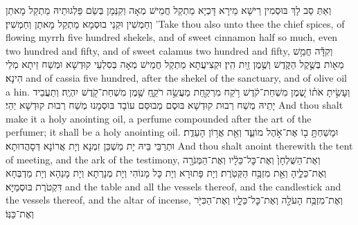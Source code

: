 {וְאַתְּ סַב לָךְ בּוּסְמִין רֵישָׁא מֵירָא דָּכְיָא מַתְקַל חֲמֵישׁ מְאָה וְקִנְּמָן בְּשַׂם פַּלְגוּתֵיהּ מַתְקַל מָאתַן וְחַמְשִׁין וּקְנֵי בוּסְמָא מַתְקַל מָאתַן וְחַמְשִׁין׃}
{’Take thou also unto thee the chief spices, of flowing myrrh five hundred shekels, and of sweet cinnamon half so much, even two hundred and fifty, and of sweet calamus two hundred and fifty,}{}
{וְקִדָּ֕ה חֲמֵ֥שׁ מֵא֖וֹת בְּשֶׁ֣קֶל הַקֹּ֑דֶשׁ וְשֶׁ֥מֶן זַ֖יִת הִֽין׃
}
{וּקְצִיעֲתָא מַתְקַל חֲמֵישׁ מְאָה בְּסִלְעֵי קוּדְשָׁא וּמְשַׁח זֵיתָא מְלֵי הִינָא׃}
{and of cassia five hundred, after the shekel of the sanctuary, and of olive oil a hin.}{}
{וְעָשִׂ֣יתָ אֹת֗וֹ שֶׁ֚מֶן מִשְׁחַת־קֹ֔דֶשׁ רֹ֥קַח מִרְקַ֖חַת מַעֲשֵׂ֣ה רֹקֵ֑חַ שֶׁ֥מֶן מִשְׁחַת־קֹ֖דֶשׁ יִהְיֶֽה׃
}
{וְתַעֲבֵיד יָתֵיהּ מְשַׁח רְבוּת קוּדְשָׁא בּוּסֶם מְבוּסַּם עוֹבָד בּוּסְמָנוּ מְשַׁח רְבוּת קוּדְשָׁא יְהֵי׃}
{And thou shalt make it a holy anointing oil, a perfume compounded after the art of the perfumer; it shall be a holy anointing oil.}{}
{וּמָשַׁחְתָּ֥ ב֖וֹ אֶת־אֹ֣הֶל מוֹעֵ֑ד וְאֵ֖ת אֲר֥וֹן הָעֵדֻֽת׃
}
{וּתְרַבֵּי בֵּיהּ יָת מַשְׁכַּן זִמְנָא וְיָת אֲרוֹנָא דְּסָהֲדוּתָא׃}
{And thou shalt anoint therewith the tent of meeting, and the ark of the testimony,}{}
{וְאֶת־הַשֻּׁלְחָן֙ וְאֶת־כׇּל־כֵּלָ֔יו וְאֶת־הַמְּנֹרָ֖ה וְאֶת־כֵּלֶ֑יהָ וְאֵ֖ת מִזְבַּ֥ח הַקְּטֹֽרֶת׃}
{וְיָת פָּתוּרָא וְיָת כָּל מָנוֹהִי וְיָת מְנָרְתָא וְיָת מָנַהָא וְיָת מַדְבְּחָא דִּקְטֹרֶת בּוּסְמַיָּא׃}
{and the table and all the vessels thereof, and the candlestick and the vessels thereof, and the altar of incense,}{}
{וְאֶת־מִזְבַּ֥ח הָעֹלָ֖ה וְאֶת־כׇּל־כֵּלָ֑יו וְאֶת־הַכִּיֹּ֖ר וְאֶת־כַּנּֽוֹ׃}
